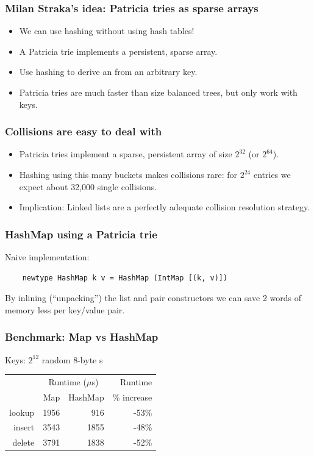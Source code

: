 \documentclass[xetex,mathserif,serif]{beamer}
\newcommand{\code}[1]{\mbox{\texttt{\small{\color{CodeColor}{#1}}}}}
\begin{document}
\begin{frame}
  \frametitle{Milan Straka's idea: Patricia tries as sparse arrays}
  \begin{itemize}
  \item We can use hashing without using hash tables!
  \item A Patricia trie implements a persistent, sparse array.
  \item Use hashing to derive an \code{Int} from an arbitrary
    key.
  \item Patricia tries are much faster than size balanced trees, but
    only work with \code{Int} keys.
  \end{itemize}
\end{frame}

\begin{frame}
  \frametitle{Collisions are easy to deal with}
  \begin{itemize}
  \item Patricia tries implement a sparse, persistent array of size
    $2^{32}$ (or $2^{64}$).
  \item Hashing using this many buckets makes collisions rare: for
    $2^{24}$ entries we expect about 32,000 single collisions.
  \item Implication: Linked lists are a perfectly adequate collision
    resolution strategy.
  \end{itemize}
\end{frame}

\begin{frame}[fragile]
  \frametitle{HashMap using a Patricia trie}

  Naive implementation:

  \begin{lstlisting}
    newtype HashMap k v = HashMap (IntMap [(k, v)])
  \end{lstlisting}

  By inlining (``unpacking'') the list and pair constructors we can
  save 2 words of memory less per key/value pair.
\end{frame}

\begin{frame}
  \frametitle{Benchmark: Map vs HashMap}

  Keys: $2^{12}$ random 8-byte \code{ByteString}s

  \bigskip
  \begin{center}
  \begin{tabular}{r|rrr}
                  & \multicolumn{2}{c}{Runtime ($\mu$s)} & Runtime \\
                  & Map & HashMap & \% increase \\
    \hline lookup & 1956 &  916 & -53\% \\
           insert & 3543 & 1855 & -48\% \\
           delete & 3791 & 1838 & -52\% \\
  \end{tabular}
  \end{center}
\end{frame}
\end{document}
